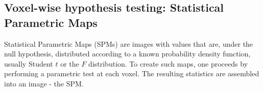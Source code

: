 







\subsection{Voxel-wise hypothesis testing: Statistical Parametric Maps} \label{subsec:spms}




Statistical Parametric Maps (SPMs) are images with values that are, under the null hypothesis, distributed according to a known probability density function, usually Student $t$ or the $F$ distribution. To create such maps, one proceeds by performing a parametric test at each voxel. The resulting statistics are assembled into an image - the SPM. 

